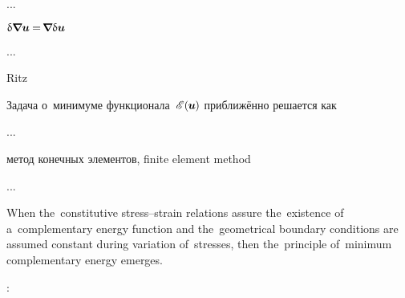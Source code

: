 ...

${\updelta\hspace{-0.1ex}\bm{\nabla}\hspace{-0.2ex} \bm{u} \hspace{-0.1ex} = \hspace{-0.3ex} \bm{\nabla}\hspace{-0.2ex} \updelta\hspace{-0.1ex}\bm{u}}$

...

Ritz

\begin{otherlanguage}{russian}

Задача о~минимуме функционала~${{\mathscr{E}\hspace{-0.2ex}} \hspace{.2ex} (\hspace{-0.1ex}\bm{u}\hspace{-0.1ex})}$ приближённо решается как

...

метод конечных элементов, finite element method

...

\end{otherlanguage}



\label{para:principleofminimumcomplementaryenergy}

\vspace{.2em}\begin{changemargin}{\parindent}{\parindent}
\small
When the~constitutive stress\hbox{--}strain relations assure the~existence of a~complementary energy function and the~geometrical boundary conditions are assumed constant during variation of~stresses, then the~principle of~minimum complementary energy emerges.
\par
\nopagebreak\vspace{.2em}
\end{changemargin}

     :

